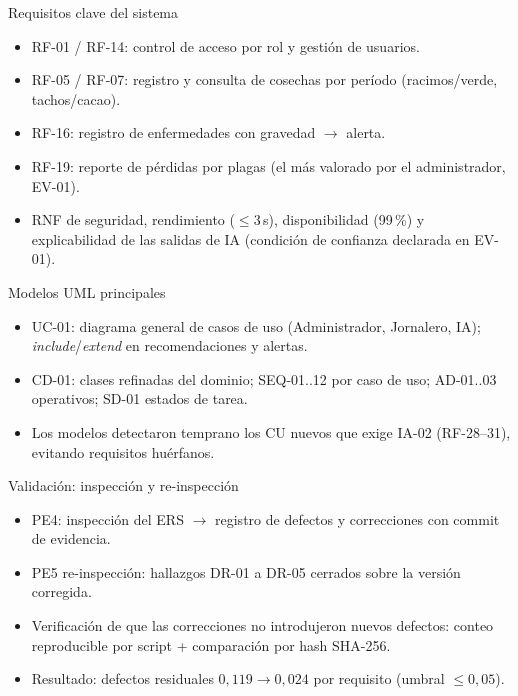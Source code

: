 \documentclass[12pt,aspectratio=169]{beamer}
\begin{document}
\begin{frame}{Requisitos clave del sistema}
  \small
  \begin{itemize}
    \item RF-01 / RF-14: control de acceso por rol y gesti\'on de usuarios.
    \item RF-05 / RF-07: registro y consulta de cosechas por per\'iodo (racimos/verde, tachos/cacao).
    \item RF-16: registro de enfermedades con gravedad $\rightarrow$ alerta.
    \item RF-19: reporte de p\'erdidas por plagas (el m\'as valorado por el administrador, EV-01).
    \item RNF de seguridad, rendimiento ($\leq$3\,s), disponibilidad (99\,\%) y explicabilidad de las salidas de IA (condici\'on de confianza declarada en EV-01).
  \end{itemize}
\end{frame}

\begin{frame}{Modelos UML principales}
  \begin{itemize}
    \item UC-01: diagrama general de casos de uso (Administrador, Jornalero, IA); \emph{include}/\emph{extend} en recomendaciones y alertas.
    \item CD-01: clases refinadas del dominio; SEQ-01..12 por caso de uso; AD-01..03 operativos; SD-01 estados de tarea.
    \item Los modelos detectaron temprano los CU nuevos que exige IA-02 (RF-28--31), evitando requisitos hu\'erfanos.
  \end{itemize}
\end{frame}

\begin{frame}{Validaci\'on: inspecci\'on y re-inspecci\'on}
  \begin{itemize}
    \item PE4: inspecci\'on del ERS $\rightarrow$ registro de defectos y correcciones con commit de evidencia.
    \item PE5 re-inspecci\'on: hallazgos DR-01 a DR-05 cerrados sobre la versi\'on corregida.
    \item Verificaci\'on de que las correcciones no introdujeron nuevos defectos: conteo reproducible por script + comparaci\'on por hash SHA-256.
    \item Resultado: defectos residuales $0{,}119 \rightarrow 0{,}024$ por requisito (umbral $\leq 0{,}05$).
  \end{itemize}
\end{frame}
\end{document}
